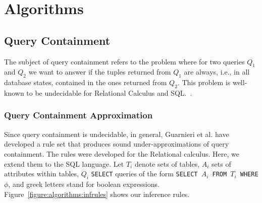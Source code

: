 \section{Algorithms}


\subsection{Query Containment}


The subject of query containment refers to the problem where for two queries $Q_1$ and $Q_2$ we want to answer if the tuples returned from $Q_1$ are always, i.e., in all database states, contained in the ones returned from $Q_2$.
%
This problem is well-known to be undecidable for Relational Calculus and SQL.~\cite{abiteboul1995foundations}.
%

\subsubsection{Query Containment Approximation}


Since query containment is undecidable, in general, Guarnieri et al. have developed a rule set that produces sound under-approximations of query containment.
%
The rules were developed for the Relational calculus. %
%
Here, we extend them to the SQL language.
%
Let $T_i$ denote sets of tables, $A_i$ sets of attributes within tables, $Q_i$ \texttt{SELECT} queries of the form \texttt{SELECT $A_i$ FROM $T_i$ WHERE $\phi$}, and greek letters stand for boolean expressions.
%
Figure~\ref{figure:algorithms:infrules} shows our inference rules.


